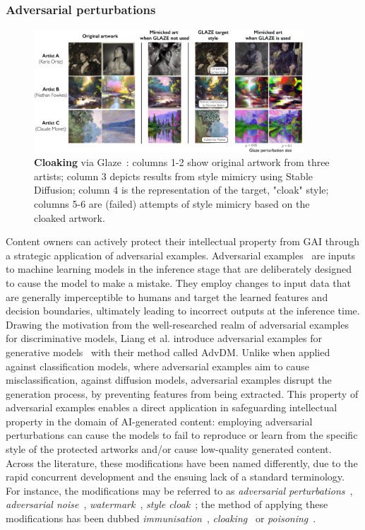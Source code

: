\documentclass[conference,table]{IEEEtran}
\begin{document}
\subsubsection{Adversarial perturbations}\label{sec:mitigation-adversarial}
\begin{figure}[ht]
    \centering
    \includegraphics[width=0.9\textwidth]{glaze.PNG}
    \caption{\textbf{Cloaking} via Glaze~\cite{shan_glaze_2023}: columns 1-2 show original artwork from three artists; column 3 depicts results from style mimicry using Stable Diffusion; column 4 is the representation of the target, "cloak" style; columns 5-6 are (failed) attempts of style mimicry based on the cloaked artwork.}
    \label{fig:cloaking}
\end{figure}
Content owners can actively protect their intellectual property from GAI through a strategic application of adversarial examples. 
Adversarial examples~\cite{goodfellow_explaining_2015} are inputs to machine learning models in the inference stage that are deliberately designed to cause the model to make a mistake. 
They employ changes to input data that are generally imperceptible to humans and target the learned features and decision boundaries, ultimately leading to incorrect outputs at the inference time. 
Drawing the motivation from the well-researched realm of adversarial examples for discriminative models, Liang et al. introduce adversarial examples for generative models~\cite{liang_adversarial_2023} with their method called AdvDM.
Unlike when applied against classification models, where adversarial examples aim to cause misclassification, against diffusion models, adversarial examples disrupt the generation process, by preventing features from being extracted. 
This property of adversarial examples enables a direct application in safeguarding intellectual property in the domain of AI-generated content: employing adversarial perturbations can cause the models to fail to reproduce or learn from the specific style of the protected artworks and/or cause low-quality generated content. 
Across the literature, these modifications have been named differently, due to the rapid concurrent development and the ensuing lack of a standard terminology. For instance, the modifications may be referred to as \textit{adversarial perturbations}~\cite{liang_adversarial_2023,liang_mist_2023}, \textit{adversarial noise}~\cite{zhao_unlearnable_2023}, \textit{watermark}~\cite{ye_duaw_2023}, \textit{style cloak}~\cite{shan_glaze_2023}; the method of applying these modifications has been dubbed \textit{immunisation}~\cite{salman_raising_2023}, \textit{cloaking}~\cite{shan_glaze_2023} or \textit{poisoning}~\cite{liu_metacloak_2024}. 
 
\end{document}
